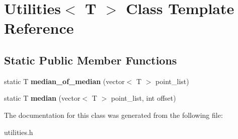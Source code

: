 \hypertarget{classUtilities}{}\section{Utilities$<$ T $>$ Class Template Reference}
\label{classUtilities}
\subsection*{Static Public Member Functions}
\begin{DoxyCompactItemize}
\item 
\mbox{\label{classUtilities_a5188d7fb6ac5f4bb2d86b51036228a9e}} 
static T {\bfseries median\+\_\+of\+\_\+median} (vector$<$ T $>$ point\+\_\+list)
\item 
\mbox{\label{classUtilities_ae9ee68213ba1cece2fc58d79a31dba2c}} 
static T {\bfseries median} (vector$<$ T $>$ point\+\_\+list, int offset)
\end{DoxyCompactItemize}


The documentation for this class was generated from the following file\+:\begin{DoxyCompactItemize}
\item 
utilities.\+h\end{DoxyCompactItemize}
